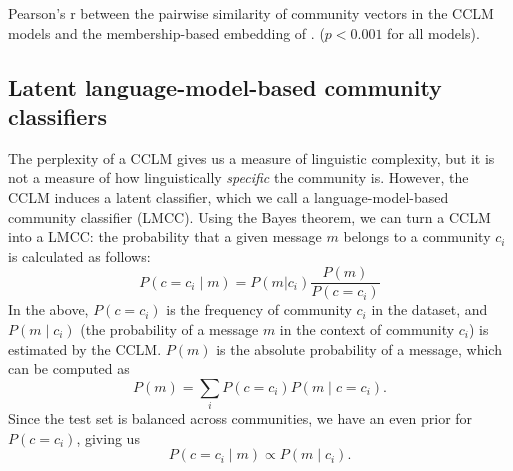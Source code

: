 \documentclass[11pt,a4paper]{article}
\begin{document}
\begin{table}
  \centering
  
  \caption{Pearson's r between the pairwise similarity of community vectors
  in the CCLM models and the membership-based embedding of \citet{Kumar2018}.
  ($p<0.001$ for all models).
  }
  \label{tab:pairwise-comm-sim}
\end{table}

\subsection{Latent language-model-based community classifiers}

The perplexity of a CCLM gives us a measure of linguistic complexity,
but it is not a measure of how linguistically \emph{specific} the
community is. However, the CCLM induces a latent classifier,
which we call a language-model-based community classifier
(LMCC). Using the Bayes theorem, we can turn a
CCLM into a LMCC: the probability that a given message $m$
belongs to a community $c_i$ is calculated as follows:
\[P(c=c_i \mid m) = P(m | c_i)\frac {P(m)} {P(c=c_i)}\]
In the above,
$P(c=c_i)$ is the frequency of community $c_i$ in the dataset, and
$P(m \mid c_i)$ (the probability of a message $m$
in the context of community $c_i$) is estimated by the CCLM. 
$P(m)$ is the absolute
probability of a message, which can be computed as
\[P(m) = \sum_i P(c=c_i) P(m\mid c=c_i ). \]
Since the test set is balanced across communities,
we have an even prior for $P(c=c_i)$, giving us
\[P(c=c_i\mid m) \propto  P(m\mid c_i).\]
\end{document}
